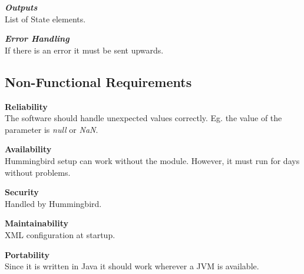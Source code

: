 \textbf{\emph{Outputs}}\\
List of State elements.


\textbf{\emph{Error Handling}}\\
If there is an error it must be sent upwards.


\subsection{Non-Functional Requirements}

\textbf{Reliability}\\
The software should handle unexpected values correctly. Eg. the value of the parameter is \emph{null} or \emph{NaN}.

\textbf{Availability}\\
Hummingbird setup can work without the module. However, it must run for days without problems.

\textbf{Security}\\
Handled by Hummingbird.

\textbf{Maintainability}\\
XML configuration at startup.

\textbf{Portability}\\
Since it is written in Java it should work wherever a JVM is available.



\newpage

